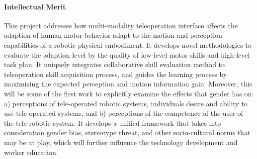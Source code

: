 \paragraph*{\Large Intellectual Merit}
This project addresses how multi-modality teleoperation interface affects the adaption of human motor behavior adapt to the motion and perception capabilities of a robotic physical embodiment. It develops novel methodologies to evaluate the adaption level by the quality of low-level motor skills and high-level task plan. It uniquely integrates collaborative skill evaluation method to teleoperation skill acquisition process, and guides the learning process by maximizing the expected perception and motion information gain.  Moreover, this will be some of the first work to explicitly examine the effects that gender has on: a) perceptions of tele-operated robotic systems, individuals desire and ability to use tele-operated systems, and b) perceptions of the competence of the user of the tele-robotic system. It develops a unified framework that takes into consideration gender bias, stereotype threat, and other socio-cultural norms that may be at play, which will further influence the technology development and worker education. 






